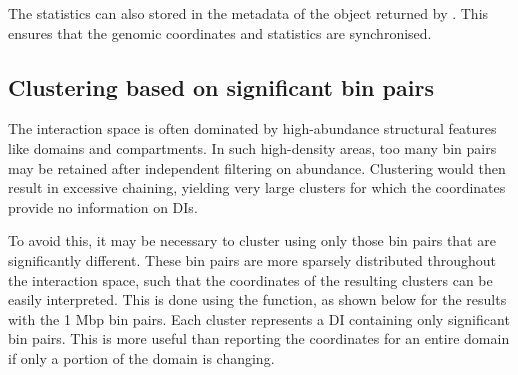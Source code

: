 \documentclass{report}\usepackage[]{graphicx}\usepackage[usenames,dvipsnames]{color}
\newcommand{\hlnum}[1]{\textcolor[rgb]{0.816,0.125,0.439}{#1}}%
\newcommand{\hlstr}[1]{\textcolor[rgb]{0.251,0.627,0.251}{#1}}%
\newcommand{\hlopt}[1]{\textcolor[rgb]{0,0,0}{#1}}%
\newcommand{\hlstd}[1]{\textcolor[rgb]{0.251,0.251,0.251}{#1}}%
\newcommand{\hlkwb}[1]{\textcolor[rgb]{0,0,0}{#1}}%
\newcommand{\hlkwc}[1]{\textcolor[rgb]{0.251,0.251,0.251}{#1}}%
\newcommand{\hlkwd}[1]{\textcolor[rgb]{0.878,0.439,0.125}{#1}}%
\newenvironment{knitrout}{}{} %
\begin{document}
\begin{knitrout}
\color{fgcolor}
\end{knitrout}

The statistics can also stored in the metadata of the  object returned by . 
This ensures that the genomic coordinates and statistics are synchronised.

\begin{knitrout}
\color{fgcolor}
\end{knitrout}

\subsection{Clustering based on significant bin pairs}
\label{sec:sigclust}
The interaction space is often dominated by high-abundance structural features like domains and compartments. 
In such high-density areas, too many bin pairs may be retained after independent filtering on abundance.
Clustering would then result in excessive chaining, yielding very large clusters for which the coordinates provide no information on DIs.

To avoid this, it may be necessary to cluster using only those bin pairs that are significantly different.
These bin pairs are more sparsely distributed throughout the interaction space, such that the coordinates of the resulting clusters can be easily interpreted.
This is done using the  function, as shown below for the results with the 1 Mbp bin pairs.
Each cluster represents a DI containing only significant bin pairs.
This is more useful than reporting the coordinates for an entire domain if only a portion of the domain is changing.
\end{document}
